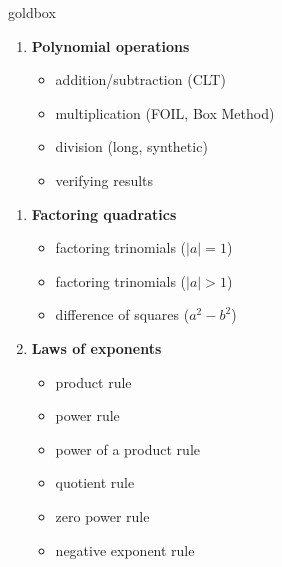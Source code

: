 \documentclass[10pt]{article}
\begin{document}
\begin{skillbox}{goldbox}
\begin{minipage}[t]{0.48\linewidth}
\begin{enumerate}
                \begin{itemize}
                    \item combine like terms (\textbf{CLT}) where like terms = terms with the same exponent of the variable
                    \item using variables and test values to determine equivalence
                \end{itemize}
                \item \textbf{Polynomial operations}
                \begin{itemize}
                    \item addition/subtraction (CLT)
                    \item multiplication (FOIL, Box Method)
                    \item division (long, synthetic)
                    \item verifying results
                \end{itemize}
            \end{enumerate}
        \end{minipage}
        \hfill
        \begin{minipage}[t]{0.48\linewidth}
            \begin{enumerate}[start=5]
                \item \textbf{Factoring quadratics}
                \begin{itemize}
                    \item factoring trinomials ($|a| = 1$)
                    \item factoring trinomials ($|a| > 1$)
                    \item difference of squares ($a^2 - b^2$)
                \end{itemize}
                \item \textbf{Laws of exponents}
                \begin{itemize}
                    \item product rule
                    \item power rule
                    \item power of a product rule
                    \item quotient rule
                    \item zero power rule
                    \item negative exponent rule
                \end{itemize}

\end{enumerate}
\end{minipage}
\end{skillbox}
\end{document}
